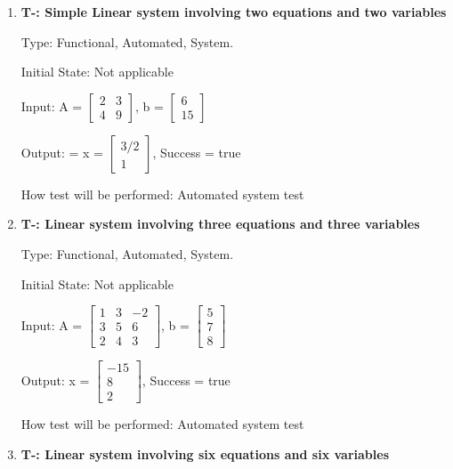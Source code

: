 \documentclass[12pt, titlepage]{article}
\newcounter{tnum}
\begin{document}
\begin{enumerate}

\item{\textbf{T-\thetnum \label{t-gauss-jordan_simple}:
Simple Linear system involving two equations and two variables}}


Type: Functional, Automated, System.
					
Initial State: Not applicable
					
Input: A = $\begin{bmatrix} 
2 & 3 \\
4 & 9 
\end{bmatrix}$, b = $\begin{bmatrix} 
6 \\
15 
\end{bmatrix}$

Output: = x = $\begin{bmatrix} 
3/2\\
1
\end{bmatrix}$, Success = true
					
How test will be performed: Automated system test
					
\item{\textbf{T-\thetnum \label{t-gauss-jordan
elimination_three}: Linear system involving three equations and three
variables}}

Type: Functional, Automated, System.
					
Initial State: Not applicable
					
Input: A =  $\begin{bmatrix} 
1 & 3 & -2 \\
3 & 5 & 6\\
2 & 4 & 3
\end{bmatrix}$, b = $\begin{bmatrix} 
5\\
7\\
8 
\end{bmatrix}$
					
Output: x = $\begin{bmatrix} 
-15\\
8\\
2 
\end{bmatrix}$, Success = true
					
How test will be performed: Automated system test

\item{\textbf{T-\thetnum \label{t-gauss-jordan_six}: Linear
system involving six equations and six variables}}


\end{enumerate}
\end{document}
